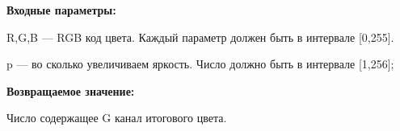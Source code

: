 \textbf{Входные параметры:}  

R,G,B --- RGB код цвета. Каждый параметр должен быть в интервале [0,255].

p --- во сколько увеличиваем яркость. Число должно быть в интервале [1,256];

\textbf{Возвращаемое значение:}

Число содержащее G канал итогового цвета.